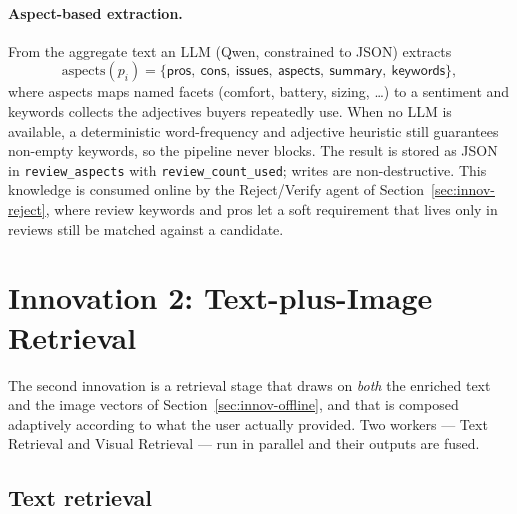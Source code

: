 \paragraph{Aspect-based extraction.}
From the aggregate text an LLM (Qwen, constrained to JSON) extracts
\begin{equation}
  \mathrm{aspects}(p_i)=\{\textsf{pros},\ \textsf{cons},\ \textsf{issues},\
  \textsf{aspects},\ \textsf{summary},\ \textsf{keywords}\},
  \label{eq:aspects}
\end{equation}
where \textsf{aspects} maps named facets (comfort, battery, sizing, \dots) to a
sentiment and \textsf{keywords} collects the adjectives buyers repeatedly use.
When no LLM is available, a deterministic word-frequency and adjective heuristic
still guarantees non-empty keywords, so the pipeline never blocks. The result is
stored as JSON in \texttt{review\_aspects} with \texttt{review\_count\_used};
writes are non-destructive. This knowledge is consumed online by the
Reject/Verify agent of Section~\ref{sec:innov-reject}, where review keywords and
pros let a soft requirement that lives only in reviews still be matched against a
candidate.

\section{Innovation 2: Text-plus-Image Retrieval}
\label{sec:innov-retrieval}

The second innovation is a retrieval stage that draws on \emph{both} the enriched
text and the image vectors of Section~\ref{sec:innov-offline}, and that is
composed adaptively according to what the user actually provided. Two workers ---
Text Retrieval and Visual Retrieval --- run in parallel and their outputs are
fused.

\subsection{Text retrieval}
\label{sec:text}

